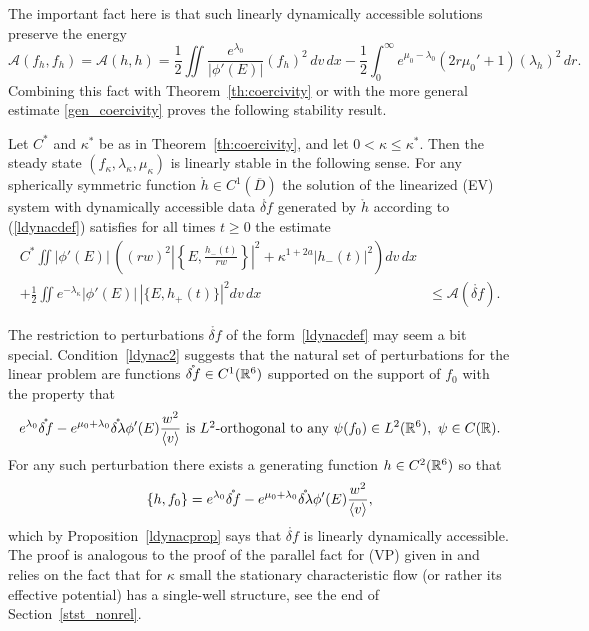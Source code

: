 \documentclass[11pt]{article}
\begin{document}
The important fact here is that
such linearly dynamically accessible solutions 
preserve the energy
\begin{equation}\label{linen}
  \mathcal{A}(f_h,f_h)
  = \mathcal{A}(h,h)
  =
  \frac{1}{2}\iint \frac{e^{\lambda_0}}{|\phi'(E)|}(f_h)^2\,dv\,dx
  - \frac{1}{2}\int_0^\infty e^{\mu_0 - \lambda_0}
  \left(2 r \mu_0' +1\right) (\lambda_h)^2\,dr.
\end{equation}
Combining this fact with Theorem~\ref{th:coercivity} or with the
more general estimate \eqref{gen_coercivity} proves the following
stability result.
%
%
\begin{theorem}\label{linstabthm}
  Let $C^\ast$ and $\kappa^\ast$ be as in Theorem~\ref{th:coercivity},
  and let $0<\kappa \leq \kappa^\ast$. Then the steady state
  $(f_\kappa,\lambda_\kappa,\mu_\kappa)$
  is linearly stable in the following sense. 
  For any spherically symmetric function
  $\mathring{h}\in C^1(\overline{D})$ the solution of the linearized
  (EV) system with dynamically accessible data $\mathring{\delta f}$
  generated by $\mathring{h}$
  according to (\ref{ldynacdef}) satisfies
  for all times $t\geq 0$ the estimate
  \begin{align*}
    C^\ast\iint|\phi'(E)|\,\left((rw)^2 
    \left|\left\{E,\frac{h_-(t)}{rw}\right\}\right|^2 
    + \kappa^{1+2a} |h_-(t)|^2\right) dv\,dx 
    &\\
    +
    \frac{1}{2}
    \iint e^{-\lambda_\kappa} |\phi'(E)|\, \left|\{E,h_+(t)\}\right|^2 dv\,dx
    &\leq
    \mathcal{A}(\mathring{\delta f}).
  \end{align*}
\end{theorem}
%
%
The restriction to perturbations 
$\mathring{\delta f}$ of the form~\eqref{ldynacdef} may seem a bit special.
Condition~\eqref{ldynac2} suggests that the natural
set of perturbations for the linear problem are functions
$\mathring{\delta f} \in C^1(\mathbb R^6)$ supported on the support of
$f_0$ with the property that
\[
e^{\lambda_0}\mathring{\delta f}
- e^{\mu_0+\lambda_0} \mathring{\delta \lambda}
\phi' (E) \frac{w^2}{\left\langle v\right\rangle}
\ \mbox{is $L^2$-orthogonal to any}\ \psi(f_0) \in L^2(\mathbb R^6),
\ \psi\in C (\mathbb R).
\]
For any such perturbation 
there exists a generating function $h\in C^2(\mathbb R^6)$ so that
\[
\{h,f_0\} = e^{\lambda_0}\mathring{\delta f}
- e^{\mu_0+\lambda_0} \mathring{\delta \lambda} \phi' (E)
\frac{w^2}{\left\langle v\right\rangle}, 
\] 
which by Proposition~\ref{ldynacprop} says that $\mathring{\delta f}$ is
linearly dynamically accessible.
The proof is analogous to the proof of the parallel 
fact for (VP) given in \cite[Section~3.2]{GuRe2007} and
relies on the fact that for $\kappa$ small the stationary characteristic
flow (or rather its effective potential) has a single-well structure,
see the end of Section~\ref{stst_nonrel}.
%
%
\end{document}
